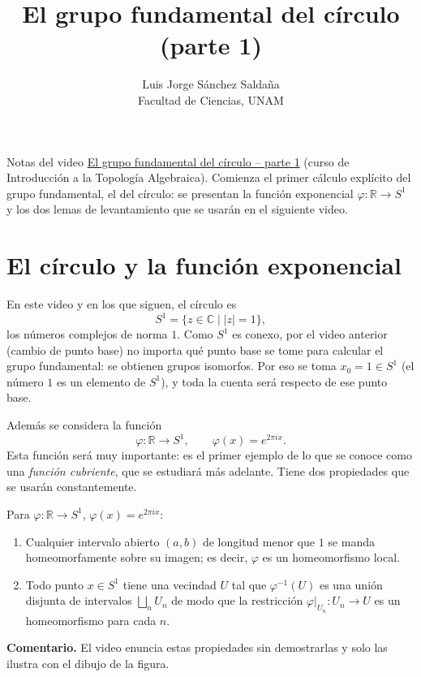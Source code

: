 \documentclass[11pt]{article}
\title{El grupo fundamental del círculo (parte 1)}
\author{Luis Jorge Sánchez Saldaña\\[2pt]\small Facultad de Ciencias, UNAM}
\date{}
\begin{document}
\maketitle

\noindent\small Notas del video
\href{https://www.youtube.com/watch?v=P4kudEdU4mE}{\guillemotleft{}El grupo fundamental del círculo -- parte 1\guillemotright{}}
(curso de Introducción a la Topología Algebraica). Comienza el primer cálculo explícito del grupo fundamental, el del círculo: se presentan la función exponencial $\varphi\colon\mathbb{R}\to S^1$ y los dos lemas de levantamiento que se usarán en el siguiente video.
\normalsize

\section*{El círculo y la función exponencial}

En este video y en los que siguen, el círculo es
\[
  S^1=\{z\in\mathbb{C}\mid |z|=1\},
\]
los números complejos de norma $1$. Como $S^1$ es conexo, por el video anterior (cambio de punto base) no importa qué punto base se tome para calcular el grupo fundamental: se obtienen grupos isomorfos. Por eso se toma $x_0=1\in S^1$ (el número $1$ es un elemento de $S^1$), y toda la cuenta será respecto de ese punto base.

Además se considera la función
\[
  \varphi\colon\mathbb{R}\longrightarrow S^1,
  \qquad
  \varphi(x)=e^{2\pi i x}.
\]
Esta función será muy importante: es el primer ejemplo de lo que se conoce como una \emph{función cubriente}, que se estudiará más adelante. Tiene dos propiedades que se usarán constantemente.

\begin{prop}
Para $\varphi\colon\mathbb{R}\to S^1$, $\varphi(x)=e^{2\pi i x}$:
\begin{enumerate}
  \item Cualquier intervalo abierto $(a,b)$ de longitud menor que $1$ se manda homeomorfamente sobre su imagen; es decir, $\varphi$ es un homeomorfismo local.
  \item Todo punto $x\in S^1$ tiene una vecindad $U$ tal que $\varphi^{-1}(U)$ es una unión disjunta de intervalos $\bigsqcup_n U_n$ de modo que la restricción $\varphi|_{U_n}\colon U_n\to U$ es un homeomorfismo para cada $n$.
\end{enumerate}
\end{prop}

\noindent\textbf{Comentario.} El video enuncia estas propiedades sin demostrarlas y solo las ilustra con el dibujo de la figura.
\end{document}
